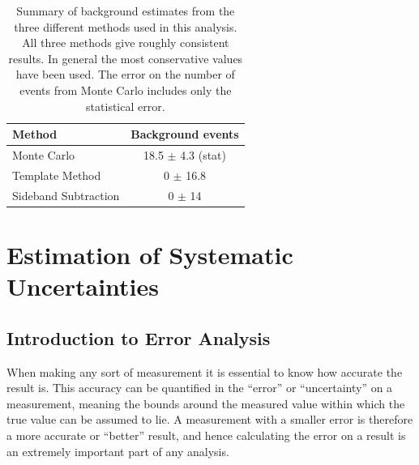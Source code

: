 \begin{table}[htbp]
  \begin{center}
    \caption[\fixspacing Summary of background estimates from different methods]{
      \fixspacing Summary of background estimates from the three 
      different methods used in this analysis.  
      All three methods give roughly consistent results.  
      In general the most conservative values have been used.  
      The error on the number of events from Monte Carlo 
      includes only the statistical error.  
    }
    \label{TableBGSub}
    \begin{tabular}[]{ | l | c | }
      \hline
      Method & Background events \\ \hline \hline
      Monte Carlo & 18.5 $\pm$ 4.3 (stat) \\ \hline 
      Template Method & 0 $\pm$ 16.8 \\ \hline 
      Sideband Subtraction & 0 $\pm$ 14 \\ \hline 
    \end{tabular}
  \end{center}
\end{table}


\section{Estimation of Systematic Uncertainties}
\label{anMeth:Systs}


\subsection{Introduction to Error Analysis}
\label{anMeth:SystsIntro}

When making any sort of measurement it is essential 
to know how accurate the result is.  
This accuracy can be quantified in the 
``error'' or ``uncertainty'' 
on a measurement, 
meaning the bounds around the measured value 
within which the true value can be assumed to lie.  
A measurement with a smaller error is 
therefore a more accurate or ``better'' result, 
and hence calculating the error on a result is 
an extremely important part of 
any analysis.  

